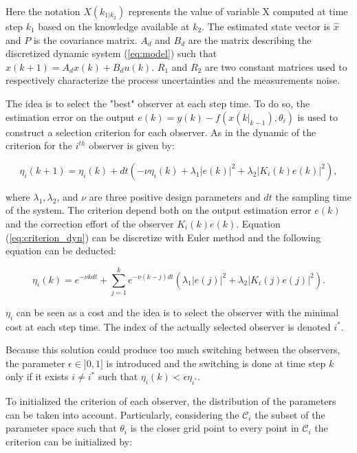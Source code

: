 Here the notation $X(k_{1|k_2})$ represents the value of variable X computed at time step $k_1$ based on the knowledge available at $k_2$. The estimated state vector is $\hat{x}$ and $P$ is the covariance matrix. $A_d$ and $B_d$ are the matrix describing the discretized dynamic system (\ref{eq:model}) such that $x(k+1) = A_dx(k) + B_d u(k)$. $R_1$ and $R_2$ are two constant matrices used to respectively characterize the process uncertainties and the measurements noise.
\medskip


The idea is to select the "best" observer at each step time. To do so, the estimation error on the output $e(k) = y(k) - f(x(k|_{k-1}), \theta_i)$ is used to construct a selection criterion for each observer. As in \cite{petriImprovingEstimationPerformance2022} the dynamic of the criterion for the $i^{th}$ observer is given by:

\begin{equation}
\eta_i (k+1) = \eta_i (k) + dt \left(- \nu \eta_i(k) + \lambda_1 |e(k)|^2 + \lambda_2 |K_i(k) e(k)|^2 \right),
\label{eq:criterion_dyn}
\end{equation}

where $\lambda_1, \lambda_2$, and $\nu$ are three positive design parameters and $dt$ the sampling time of the system. The criterion depend both on the output estimation error $e(k)$ and the correction effort of the observer $K_i(k) e(k)$. Equation (\ref{eq:criterion_dyn}) can be discretize with Euler method and the following equation can be deducted:

\begin{equation}
\eta_i(k) = e^{-\nu k dt} + \sum_{j=1}^{k} e^{-\nu(k-j)dt} (\lambda_1 |e(j)|^2 + \lambda_2 |K_i(j) e(j)|^2 ).
\end{equation} 

$\eta_i$ can be seen as a cost and the idea is to select the observer with the minimal cost at each step time. The index of the actually selected observer is denoted $i^*$.

\medskip
Because this solution could produce too much switching between the observers, the parameter $\epsilon \in ]0,1]$ is introduced and the switching is done at time step $k$ only if it exists $i\neq i^*$ such that $\eta_i(k)<\epsilon \eta_{i^*}$.
\medskip

To initialized the criterion of each observer, the distribution of the parameters can be taken into account. Particularly, considering the $\mathcal{C}_i$ the subset of the parameter space such that $\theta_i$ is the closer grid point to every point in $\mathcal{C}_i$ the criterion can be initialized by:

